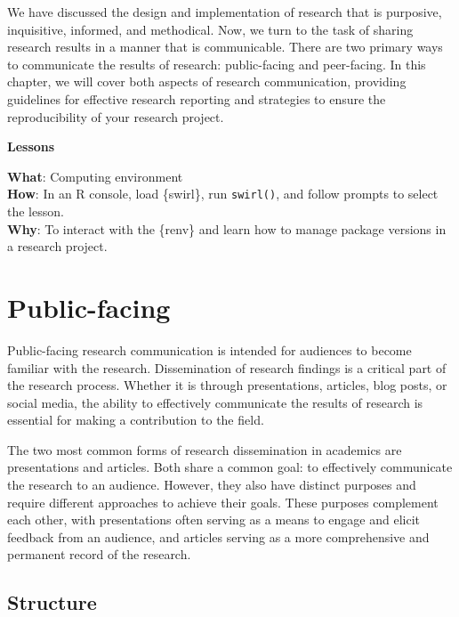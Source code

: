 \documentclass[
  letterpaper,
]{book}
\theoremstyle{definition}
\theoremstyle{remark}
\begin{document}
We have discussed the design and implementation of research that is
purposive, inquisitive, informed, and methodical. Now, we turn to the
task of sharing research results in a manner that is communicable. There
are two primary ways to communicate the results of research:
public-facing and peer-facing. In this chapter, we will cover both
aspects of research communication, providing guidelines for effective
research reporting and strategies to ensure the reproducibility of your
research project.

\begin{tcolorbox}[enhanced jigsaw, breakable, colframe=quarto-callout-color-frame, toprule=.15mm, arc=.35mm, colback=white, left=2mm, bottomrule=.15mm, rightrule=.15mm, opacityback=0, leftrule=.75mm]

\textbf{ Lessons}

\textbf{What}: Computing environment\\
\textbf{How}: In an R console, load \{swirl\}, run \texttt{swirl()}, and
follow prompts to select the lesson.\\
\textbf{Why}: To interact with the \{renv\} and learn how to manage
package versions in a research project.

\end{tcolorbox}

\section{Public-facing}\label{sec-contribute-public-facing}

Public-facing research communication is intended for audiences to become
familiar with the research. Dissemination of research findings is a
critical part of the research process. Whether it is through
presentations, articles, blog posts, or social media, the ability to
effectively communicate the results of research is essential for making
a contribution to the field.

The two most common forms of research dissemination in academics are
presentations and articles. Both share a common goal: to effectively
communicate the research to an audience. However, they also have
distinct purposes and require different approaches to achieve their
goals. These purposes complement each other, with presentations often
serving as a means to engage and elicit feedback from an audience, and
articles serving as a more comprehensive and permanent record of the
research.

\subsection{Structure}\label{sec-contribute-public-structure}
\end{document}
